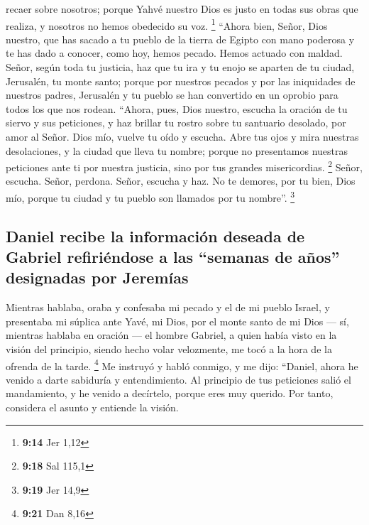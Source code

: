 recaer sobre nosotros; porque Yahvé nuestro Dios es justo en todas sus
obras que realiza, y nosotros no hemos obedecido su voz. \footnote{\textbf{9:14}
  Jer 1,12}  ``Ahora bien, Señor, Dios nuestro, que has
sacado a tu pueblo de la tierra de Egipto con mano poderosa y te has
dado a conocer, como hoy, hemos pecado. Hemos actuado con maldad.
 Señor, según toda tu justicia, haz que tu ira y tu enojo
se aparten de tu ciudad, Jerusalén, tu monte santo; porque por nuestros
pecados y por las iniquidades de nuestros padres, Jerusalén y tu pueblo
se han convertido en un oprobio para todos los que nos rodean.
 ``Ahora, pues, Dios nuestro, escucha la oración de tu
siervo y sus peticiones, y haz brillar tu rostro sobre tu santuario
desolado, por amor al Señor.  Dios mío, vuelve tu oído y
escucha. Abre tus ojos y mira nuestras desolaciones, y la ciudad que
lleva tu nombre; porque no presentamos nuestras peticiones ante ti por
nuestra justicia, sino por tus grandes misericordias. \footnote{\textbf{9:18}
  Sal 115,1}  Señor, escucha. Señor, perdona. Señor,
escucha y haz. No te demores, por tu bien, Dios mío, porque tu ciudad y
tu pueblo son llamados por tu nombre''. \footnote{\textbf{9:19} Jer 14,9}

\hypertarget{daniel-recibe-la-informaciuxf3n-deseada-de-gabriel-refiriuxe9ndose-a-las-semanas-de-auxf1os-designadas-por-jeremuxedas}{%
\subsection{Daniel recibe la información deseada de Gabriel refiriéndose
a las ``semanas de años'' designadas por
Jeremías}\label{daniel-recibe-la-informaciuxf3n-deseada-de-gabriel-refiriuxe9ndose-a-las-semanas-de-auxf1os-designadas-por-jeremuxedas}}

 Mientras hablaba, oraba y confesaba mi pecado y el de mi
pueblo Israel, y presentaba mi súplica ante Yavé, mi Dios, por el monte
santo de mi Dios ---  sí, mientras hablaba en oración ---
el hombre Gabriel, a quien había visto en la visión del principio,
siendo hecho volar velozmente, me tocó a la hora de la ofrenda de la
tarde. \footnote{\textbf{9:21} Dan 8,16}  Me instruyó y
habló conmigo, y me dijo: ``Daniel, ahora he venido a darte sabiduría y
entendimiento.  Al principio de tus peticiones salió el
mandamiento, y he venido a decírtelo, porque eres muy querido. Por
tanto, considera el asunto y entiende la visión.

